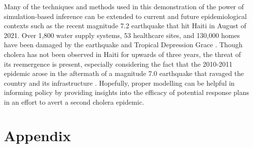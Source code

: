 \documentclass[12pt]{article}
\begin{document}
  Many of the techniques and methods used in this demonstration of the power of simulation\hyp{}based inference can be extended to current and future epidemiological contexts such as the recent magnitude 7.2 earthquake that hit Haiti in August of 2021. Over 1,800 water supply systems, 53 healthcare sites, and 130,000 homes have been damaged by the earthquake and Tropical Depression Grace \cite{uni}. Though cholera has not been observed in Haiti for upwards of three years, the threat of its reemergence is present, especially considering the fact that the 2010-2011 epidemic arose in the aftermath of a magnitude 7.0 earthquake that ravaged the country and its infrastructure \cite{Sanon}. Hopefully, proper modelling can be helpful in informing policy by providing insights into the efficacy of potential response plans in an effort to avert a second cholera epidemic.

\newpage

\section{Appendix}
\end{document}

